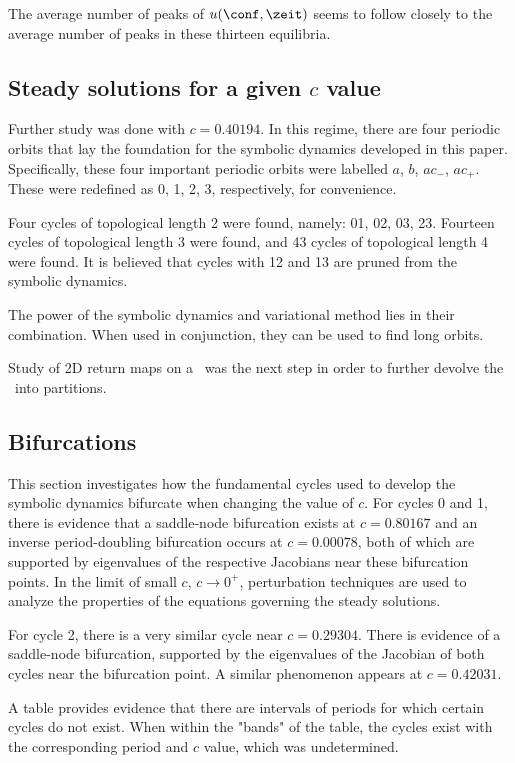 The average number of peaks of $u(\conf, \zeit)$ seems to follow closely to the average number of peaks in these thirteen equilibria.

\subsection{Steady solutions for a given $c$ value}
\label{sect:MNGsteadyFIXc}


Further study was done with $c=0.40194$. In this regime,
there are four periodic orbits that lay the foundation for
the symbolic dynamics developed in this paper. Specifically, these four important periodic orbits were labelled $a$, $b$, $ac_-$, $ac_+$. These were redefined as 0, 1, 2, 3, respectively, for convenience.

Four cycles of topological length 2 were found, namely: 01, 02, 03, 23. Fourteen cycles of topological length 3 were found, and 43 cycles of topological length 4 were found. It is believed that cycles with 12 and 13 are pruned from the symbolic dynamics.

The power of the symbolic dynamics and variational method lies in their combination. When used in conjunction, they can be used to find long orbits.

Study of 2D return maps on a \PoincSec\ was the next step in order to further devolve the \statesp\ into partitions.

\subsection{Bifurcations}
\label{sect:MNGbifur}


This section investigates how the fundamental cycles used to develop the symbolic dynamics bifurcate when changing the value of $c$. For cycles 0 and 1, there is evidence that a saddle-node bifurcation exists at $c=0.80167$ and an inverse period-doubling bifurcation occurs at $c=0.00078$, both of which are supported by eigenvalues of the respective Jacobians near these bifurcation points. In the limit of small $c$, $c\rightarrow 0^+$, perturbation techniques are used to analyze the properties of the equations governing the steady solutions.

For cycle 2, there is a very similar cycle near $c=0.29304$. There is evidence of a saddle-node bifurcation, supported by the eigenvalues of the Jacobian of both cycles near the bifurcation point. A similar phenomenon appears at $c = 0.42031$.

A table provides evidence that there are intervals of periods for which certain cycles do not exist. When within the "bands" of the table, the cycles exist with the corresponding period and $c$ value, which was undetermined.

